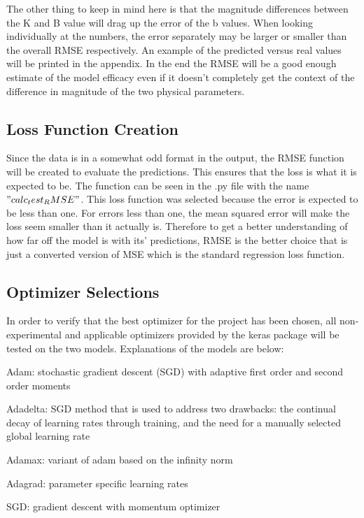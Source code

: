 \documentclass[12pt]{article}
\begin{document}
	The other thing to keep in mind here is that the magnitude differences between the K and B value will drag up the error of the b values. When looking individually at the numbers, the error separately may be larger or smaller than the overall RMSE respectively. An example of the predicted versus real values will be printed in the appendix. In the end the RMSE will be a good enough estimate of the model efficacy even if it doesn't completely get the context of the difference in magnitude of the two physical parameters.

	\subsection*{Loss Function Creation}

	Since the data is in a somewhat odd format in the output, the RMSE function will be created to evaluate the predictions. This ensures that the loss is what it is expected to be. The function can be seen in the .py file with the name $"calc_test_RMSE"$. This loss function was selected because the error is expected to be less than one. For errors less than one, the mean squared error will make the loss seem smaller than it actually is. Therefore to get a better understanding of how far off the model is with its' predictions, RMSE is the better choice that is just a converted version of MSE which is the standard regression loss function.

	\subsection*{Optimizer Selections}

	In order to verify that the best optimizer for the project has been chosen, all non-experimental and applicable optimizers provided by the keras package will be tested on the two models. Explanations of the models are below:

	Adam: stochastic gradient descent (SGD) with adaptive first order and second order moments

	Adadelta: SGD method that is used to address two drawbacks: the continual decay of learning rates through training, and the need for a manually selected global learning rate

	Adamax: variant of adam based on the infinity norm

	Adagrad: parameter specific learning rates

	SGD: gradient descent with momentum optimizer
\end{document}
